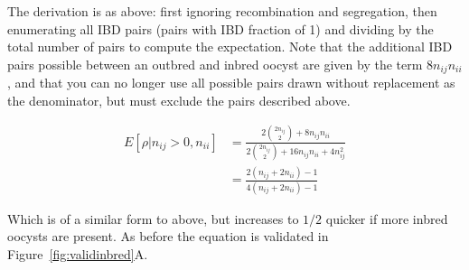 \documentclass[9pt]{article}
\begin{document}
The derivation is as above: first ignoring recombination and segregation, then enumerating all IBD pairs (pairs with IBD fraction of 1) and dividing by the total number of pairs to compute the expectation. Note that the additional IBD pairs possible between an outbred and inbred oocyst are given by the term $8n_{ij}n_{ii}$, and that you can no longer use all possible pairs drawn without replacement as the denominator, but must exclude the pairs described above.

\begin{align}
E[\rho|n_{ij} > 0, n_{ii}] & = \frac{2{2n_{ij} \choose 2} + 8n_{ij}n_{ii}}{2{2n_{ij} \choose 2} + 16n_{ij}n_{ii} + 4n_{ij}^2} \nonumber\\
& = \frac{2(n_{ij} + 2n_{ii}) - 1}{4(n_{ij} + 2n_{ii}) - 1}  \label{eq2}
\end{align}


Which is of a similar form to above, but increases to $1/2$ quicker if more inbred oocysts are present. As before the equation is validated in Figure~\ref{fig:validinbred}A.
\end{document}
